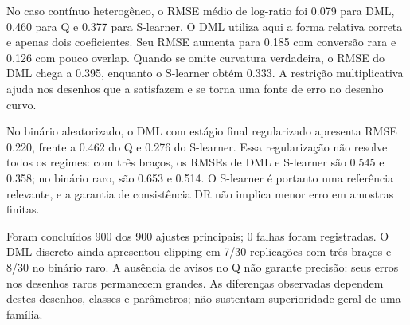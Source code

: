 No caso contínuo heterogêneo, o RMSE médio de log-ratio foi 0.079 para DML, 0.460 para Q e 0.377 para S-learner. O DML utiliza aqui a forma relativa correta e apenas dois coeficientes. Seu RMSE aumenta para 0.185 com conversão rara e 0.126 com pouco overlap. Quando se omite curvatura verdadeira, o RMSE do DML chega a 0.395, enquanto o S-learner obtém 0.333. A restrição multiplicativa ajuda nos desenhos que a satisfazem e se torna uma fonte de erro no desenho curvo.

No binário aleatorizado, o DML com estágio final regularizado apresenta RMSE 0.220, frente a 0.462 do Q e 0.276 do S-learner. Essa regularização não resolve todos os regimes: com três braços, os RMSEs de DML e S-learner são 0.545 e 0.358; no binário raro, são 0.653 e 0.514. O S-learner é portanto uma referência relevante, e a garantia de consistência DR não implica menor erro em amostras finitas.

Foram concluídos 900 dos 900 ajustes principais; 0 falhas foram registradas. O DML discreto ainda apresentou clipping em 7/30 replicações com três braços e 8/30 no binário raro. A ausência de avisos no Q não garante precisão: seus erros nos desenhos raros permanecem grandes. As diferenças observadas dependem destes desenhos, classes e parâmetros; não sustentam superioridade geral de uma família.
